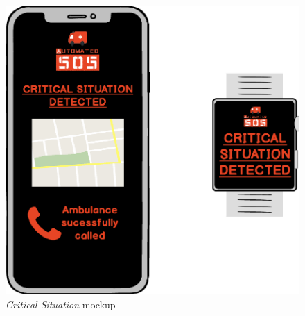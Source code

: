 \begin{figure}[H]
\begin{center}
  \includegraphics[width=\textwidth]{img/mockup/Critical_Situation.png}
  \hspace{0.05\linewidth}
  \centering
  \caption{\textit{Critical Situation} mockup}
  \label{img:criticalSituationMockup}
\end{center}
\end{figure}
